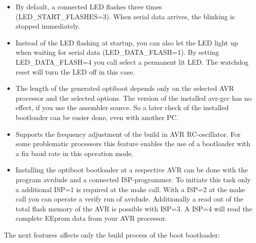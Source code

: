 \begin{itemize}
\item {By default, a connected LED flashes three times (LED\_START\_FLASHES=3).
	When serial data arrives, the blinking is stopped immediately.}

\item {Instead of the LED flashing at startup, you can also let the LED light up when waiting
	for serial data (LED\_DATA\_FLASH=1).
       By setting LED\_DATA\_FLASH=4 you call select a permanent lit LED.
		The watchdog reset will turn the LED off in this case.}

\item {The length of the generated optiboot depends only on the selected AVR processor and the selected options.
	The version of the installed avr-gcc has no effect, if you use the assembler source.
	So a later check of the installed bootloader can be easier done,
	even with another PC.}

\item {Supports the frequency adjustment of the build in AVR RC-oscillator.
	For some problematic processors this feature enables the use of a
	bootloader with a fix baud rate in this operation mode.}

\item {Installing the optiboot bootloader at a respective AVR can be done with the program avrdude and
	a connected ISP-programmer.
	To initiate this task only a additional ISP=1 is required at the make call.
	With a ISP=2 at the make call you can operate a verify run of avrdude.
	Additionally a read out of the total flash memory of the AVR is possible
	with ISP=3. A ISP=4 will read the complete EEprom data from your AVR processor.}

\end{itemize}

The next features affects only the build process of the boot bootloader:

